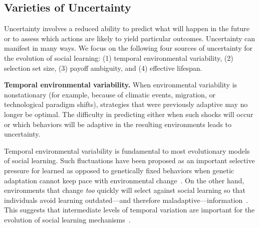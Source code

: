 \documentclass[letterpaper,11.5pt]{scrartcl}
\newcommand{\mt}[1]{{\textcolor{myorange} {({\tiny MT:} #1)}}}
\begin{document}

\subsection{Varieties of Uncertainty}

Uncertainty involves a reduced ability to predict what will happen in the future or to assess which actions are likely to yield particular outcomes. Uncertainty can manifest in many ways. We focus on the following four sources of uncertainty for the evolution of social learning: (1) temporal environmental variability, (2) selection set size, (3) payoff ambiguity, and (4) effective lifespan.

\textbf{Temporal environmental variability.} When environmental variability is nonstationary (for example, because of climatic events, migration, or technological paradigm shifts), strategies that were previously adaptive may no longer be optimal. The difficulty in predicting either when such shocks will occur or which behaviors will be adaptive in the resulting environments leads to uncertainty. 

Temporal environmental variability is fundamental to most evolutionary models of
social learning. Such fluctuations have been proposed as an important selective
pressure for learned as opposed to genetically fixed behaviors when genetic adaptation cannot keep pace with environmental change~\cite{Richerson2000}. On the other hand, environments that change \emph{too} quickly will select against social learning so that individuals avoid learning outdated---and therefore maladaptive---information~\cite{Feldman1996,
BoydRicherson1985}. This suggests that intermediate levels of temporal variation
are important for the evolution of social learning mechanisms~\cite{aoki2005}.
\end{document}
